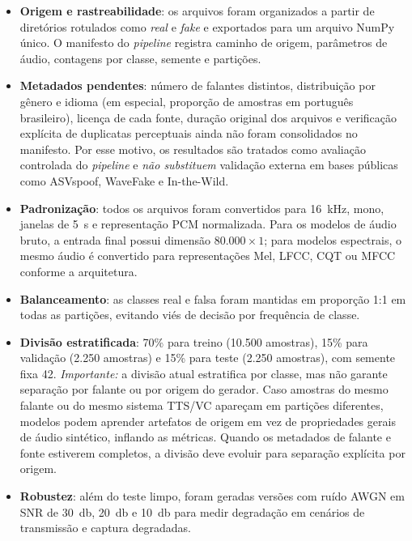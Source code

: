 \documentclass[12pt,a4paper]{article}
\begin{document}
\begin{itemize}
    \item \textbf{Origem e rastreabilidade}: os arquivos foram organizados a
    partir de diretórios rotulados como \textit{real} e \textit{fake} e
    exportados para um arquivo NumPy único. O manifesto do \textit{pipeline} registra
    caminho de origem, parâmetros de áudio, contagens por classe, semente e
    partições.

    \item \textbf{Metadados pendentes}: número de falantes distintos,
    distribuição por gênero e idioma (em especial, proporção de amostras em
    português brasileiro), licença de cada fonte, duração original dos
    arquivos e verificação explícita de duplicatas perceptuais ainda não foram
    consolidados no manifesto. Por esse motivo, os resultados são tratados como
    avaliação controlada do \textit{pipeline} e \emph{não substituem} validação
    externa em bases públicas como ASVspoof, WaveFake e In-the-Wild.

    \item \textbf{Padronização}: todos os arquivos foram convertidos para
    \SI{16}{\kilo\hertz}, mono, janelas de \SI{5}{\second} e representação PCM
    normalizada. Para os modelos de áudio bruto, a entrada final possui dimensão
    $80{.}000\times1$; para modelos espectrais, o mesmo áudio é convertido para
    representações Mel, LFCC, CQT ou MFCC conforme a arquitetura.

    \item \textbf{Balanceamento}: as classes real e falsa foram mantidas em
    proporção 1:1 em todas as partições, evitando viés de decisão por
    frequência de classe.

    \item \textbf{Divisão estratificada}: 70\% para treino (10.500 amostras),
    15\% para validação (2.250 amostras) e 15\% para teste (2.250 amostras),
    com semente fixa 42. \emph{Importante:} a divisão atual estratifica por
    classe, mas não garante separação por falante ou por origem do gerador.
    Caso amostras do mesmo falante ou do mesmo sistema TTS/VC apareçam em
    partições diferentes, modelos podem aprender artefatos de origem em vez de
    propriedades gerais de áudio sintético, inflando as métricas. Quando os
    metadados de falante e fonte estiverem completos, a divisão deve evoluir
    para separação explícita por origem.

    \item \textbf{Robustez}: além do teste limpo, foram geradas versões com
    ruído AWGN em SNR de \SI{30}{\decibel}, \SI{20}{\decibel} e
    \SI{10}{\decibel} para medir degradação em cenários de transmissão e
    captura degradadas.
\end{itemize}
\end{document}
